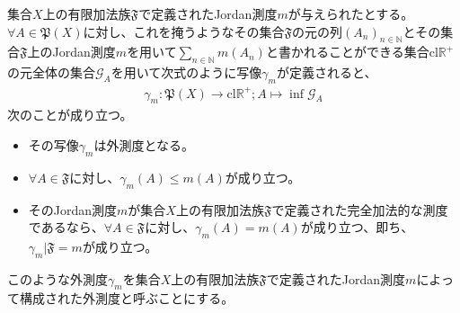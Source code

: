 \documentclass[dvipdfmx]{jsarticle}
\begin{document}
\begin{thm}\label{4.5.3.2}
集合$X$上の有限加法族$\mathfrak{F}$で定義されたJordan測度$m$が与えられたとする。$\forall A \in \mathfrak{P}(X)$に対し、これを掩うようなその集合$\mathfrak{F}$の元の列$\left( A_{n} \right)_{n \in \mathbb{N}}$とその集合$\mathfrak{F}$上のJordan測度$m$を用いて$\sum_{n \in \mathbb{N}} {m\left( A_{n} \right)}$と書かれることができる集合$\mathrm{cl}\mathbb{R}^{+}$の元全体の集合$\mathcal{G}_{A}$を用いて次式のように写像$\gamma_{m}$が定義されると、
\begin{align*}
\gamma_{m}\mathfrak{:P}(X) \rightarrow \mathrm{cl}\mathbb{R}^{+};A \mapsto \inf\mathcal{G}_{A}
\end{align*}
次のことが成り立つ。
\begin{itemize}
\item
  その写像$\gamma_{m}$は外測度となる。
\item
  $\forall A \in \mathfrak{F}$に対し、$\gamma_{m}(A) \leq m(A)$が成り立つ。
\item
  そのJordan測度$m$が集合$X$上の有限加法族$\mathfrak{F}$で定義された完全加法的な測度であるなら、$\forall A \in \mathfrak{F}$に対し、$\gamma_{m}(A) = m(A)$が成り立つ、即ち、$\gamma_{m}\mathfrak{|F} =m$が成り立つ。
\end{itemize}
\end{thm}
\begin{dfn}
このような外測度$\gamma_{m}$を集合$X$上の有限加法族$\mathfrak{F}$で定義されたJordan測度$m$によって構成された外測度と呼ぶことにする。
\end{dfn}
\end{document}
